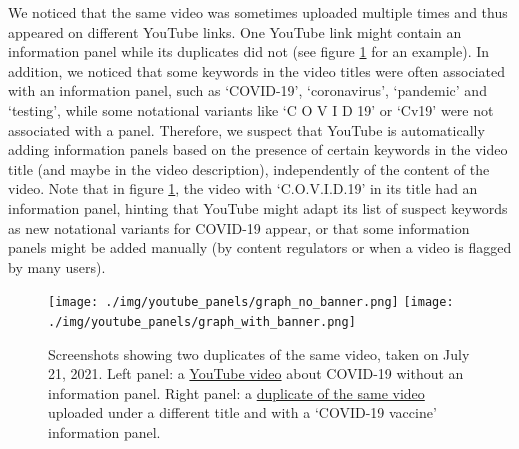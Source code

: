 \documentclass{article}
\begin{document}
\smallskip

We noticed that the same video was sometimes uploaded multiple times and thus appeared on different YouTube links. 
One YouTube link might contain an information panel while its duplicates did not (see figure \ref{duplicates_yt} for an example).  
In addition, we noticed that some keywords in the video titles were often associated with an information panel, such as `COVID-19', `coronavirus', `pandemic' and `testing', while some notational variants like `C O V I D 19' or `Cv19' were not associated with a panel.
Therefore, we suspect that YouTube is automatically adding information panels based on the presence of certain keywords in the video title (and maybe in the video description), independently of the content of the video.
Note that in figure \ref{duplicates_yt}, the video with `C.O.V.I.D.19' in its title had an information panel, hinting that YouTube might adapt its list of suspect keywords as new notational variants for COVID-19 appear, or that some information panels might be added manually (by content regulators or when a video is flagged by many users).

\begin{figure}[h]
	\centering
		\begin{multicols}{1}
		\texttt{[image: ./img/youtube\_panels/graph\_no\_banner.png]}
		\texttt{[image: ./img/youtube\_panels/graph\_with\_banner.png]} 
		\end{multicols}
	\caption{Screenshots showing two duplicates of the same video, taken on July 21, 2021. 
Left panel: a \href{https://www.youtube.com/watch?v=d9GbVZOcT18}{YouTube video} about COVID-19 without an information panel. 	
Right panel: a \href{https://www.youtube.com/watch?v=A4RvrEKoNxc}{duplicate of the same video} uploaded under a different title and with a `COVID-19 vaccine' information panel.}
	\label{duplicates_yt}
\end{figure}




\end{document}
